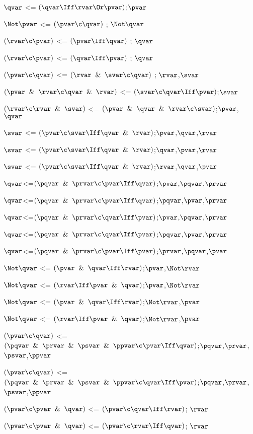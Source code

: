 $\qvar$ <= $(\qvar \Iff \rvar \Or \pvar)$;$\pvar$

$\Not \pvar$ <= $(\pvar \c \qvar)$ ; $\Not \qvar$

$(\rvar \c \pvar) $ <= $(\pvar \Iff \qvar)$ ; $\qvar$

$(\rvar \c \pvar) $ <= $(\qvar \Iff \pvar)$ ; $\qvar$

$(\pvar \c \qvar) $ <= $(\rvar \And \svar \c \qvar)$ ; $\rvar$,$\svar$

$(\pvar \And \rvar \c \qvar \And \rvar)$ <=  $(\svar \c \qvar\Iff \pvar)$;$\svar$

$(\rvar \c \rvar \And \svar)$ <=  $(\pvar \And \qvar\And \rvar\c \svar)$;$\pvar$,$\qvar$

$\svar$ <=  $(\pvar \c \svar\Iff \qvar\And \rvar)$;$\pvar$,$\qvar$,$\rvar$

$\svar$ <=  $(\pvar \c \svar\Iff \qvar\And \rvar)$;$\qvar$,$\pvar$,$\rvar$

$\svar$ <=  $(\pvar \c \svar\Iff \qvar\And \rvar)$;$\rvar$,$\qvar$,$\pvar$

$\qvar$<=$(\pqvar \And \prvar \c \pvar \Iff \qvar)$;$\pvar$,$\pqvar$,$\prvar$

$\qvar$<=$(\pqvar \And \prvar \c \pvar \Iff \qvar)$;$\pqvar$,$\pvar$,$\prvar$

$\qvar$<=$(\pqvar \And \prvar \c \qvar \Iff \pvar)$;$\pvar$,$\pqvar$,$\prvar$

$\qvar$<=$(\pqvar \And \prvar \c \qvar \Iff \pvar)$;$\pqvar$,$\pvar$,$\prvar$

$\qvar$<=$(\pqvar \And \prvar \c \pvar \Iff \pvar)$;$\prvar$,$\pqvar$,$\pvar$

$\Not \qvar$ <= $(\pvar \And \qvar \Iff \rvar)$;$\pvar$,$\Not\rvar$

$\Not \qvar$ <= $(\rvar \Iff \pvar \And \qvar)$;$\pvar$,$\Not\rvar$

$\Not \qvar$ <= $(\pvar \And \qvar \Iff \rvar)$;$\Not\rvar$,$\pvar$

$\Not \qvar$ <= $(\rvar \Iff \pvar \And \qvar)$;$\Not\rvar$,$\pvar$

$(\pvar \c \qvar)$ <= $(\pqvar \And \prvar \And \psvar \And \ppvar \c \pvar \Iff \qvar)$;$\pqvar$,$\prvar$,$\psvar$,$\ppvar$

$(\pvar \c \qvar)$ <= $(\pqvar \And \prvar \And \psvar \And \ppvar \c \qvar \Iff \pvar)$;$\pqvar$,$\prvar$,$\psvar$,$\ppvar$

$(\pvar \c \pvar \And\qvar)$ <= $(\pvar \c \qvar \Iff \rvar)$;  $\rvar$

$(\pvar \c \pvar \And\qvar)$ <= $(\pvar \c \rvar \Iff \qvar)$;  $\rvar$

